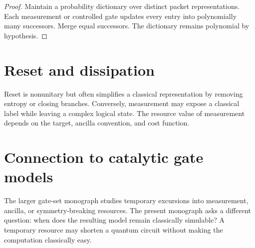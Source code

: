 \begin{proof}
Maintain a probability dictionary over distinct packet representations. Each measurement or controlled gate updates every entry into polynomially many successors. Merge equal successors. The dictionary remains polynomial by hypothesis.
\end{proof}

\section{Reset and dissipation}
Reset is nonunitary but often simplifies a classical representation by removing entropy or closing branches. Conversely, measurement may expose a classical label while leaving a complex logical state. The resource value of measurement depends on the target, ancilla convention, and cost function.

\section{Connection to catalytic gate models}
The larger gate-set monograph studies temporary excursions into measurement, ancilla, or symmetry-breaking resources. The present monograph asks a different question: when does the resulting model remain classically simulable? A temporary resource may shorten a quantum circuit without making the computation classically easy.
